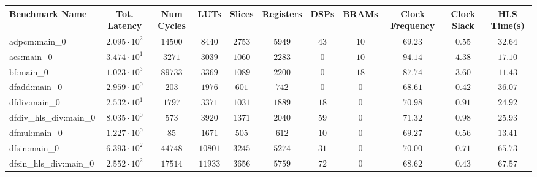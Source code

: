 \begin{tabular}{|l|c|c|c|c|c|c|c|c|c|c|}
\hline
Benchmark Name          & Tot. Latency           & Num Cycles & LUTs      & Slices    & Registers & DSPs    & BRAMs   & Clock Frequency & Clock Slack & HLS Time(s) \\
\hline
adpcm:main\_0           & $ 2.095 \cdot 10^{2} $ & $ 14500  $ & $ 8440  $ & $ 2753  $ & $ 5949  $ & $ 43  $ & $ 10  $ & $ 69.23       $ & $ 0.55    $ & $ 32.64   $ \\
aes:main\_0             & $ 3.474 \cdot 10^{1} $ & $ 3271   $ & $ 3039  $ & $ 1060  $ & $ 2283  $ & $ 0   $ & $ 10  $ & $ 94.14       $ & $ 4.38    $ & $ 17.10   $ \\
bf:main\_0              & $ 1.023 \cdot 10^{3} $ & $ 89733  $ & $ 3369  $ & $ 1089  $ & $ 2200  $ & $ 0   $ & $ 18  $ & $ 87.74       $ & $ 3.60    $ & $ 11.43   $ \\
dfadd:main\_0           & $ 2.959 \cdot 10^{0} $ & $ 203    $ & $ 1976  $ & $ 601   $ & $ 742   $ & $ 0   $ & $ 0   $ & $ 68.61       $ & $ 0.42    $ & $ 36.07   $ \\
dfdiv:main\_0           & $ 2.532 \cdot 10^{1} $ & $ 1797   $ & $ 3371  $ & $ 1031  $ & $ 1889  $ & $ 18  $ & $ 0   $ & $ 70.98       $ & $ 0.91    $ & $ 24.92   $ \\
dfdiv\_hls\_div:main\_0 & $ 8.035 \cdot 10^{0} $ & $ 573    $ & $ 3920  $ & $ 1371  $ & $ 2040  $ & $ 59  $ & $ 0   $ & $ 71.32       $ & $ 0.98    $ & $ 25.93   $ \\
dfmul:main\_0           & $ 1.227 \cdot 10^{0} $ & $ 85     $ & $ 1671  $ & $ 505   $ & $ 612   $ & $ 10  $ & $ 0   $ & $ 69.27       $ & $ 0.56    $ & $ 13.41   $ \\
dfsin:main\_0           & $ 6.393 \cdot 10^{2} $ & $ 44748  $ & $ 10801 $ & $ 3245  $ & $ 5274  $ & $ 31  $ & $ 0   $ & $ 70.00       $ & $ 0.71    $ & $ 65.73   $ \\
dfsin\_hls\_div:main\_0 & $ 2.552 \cdot 10^{2} $ & $ 17514  $ & $ 11933 $ & $ 3656  $ & $ 5759  $ & $ 72  $ & $ 0   $ & $ 68.62       $ & $ 0.43    $ & $ 67.57   $ \\

\end{tabular}
